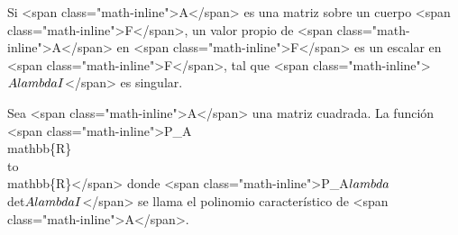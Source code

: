 \documentclass{report}
\begin{document}
    \begin{defBox}
        Si <span class="math-inline">A</span> es una matriz sobre un cuerpo <span class="math-inline">F</span>, un valor propio de <span class="math-inline">A</span> en <span class="math-inline">F</span> es un escalar en <span class="math-inline">F</span>, tal que <span class="math-inline">\(A \- \\lambda I\)</span> es singular.
    \end{defBox}

    \begin{defBox}
        Sea <span class="math-inline">A</span> una matriz cuadrada. La función <span class="math-inline">P\_A\: \\mathbb\{R\} \\to \\mathbb\{R\}</span> donde <span class="math-inline">P\_A\(\\lambda\) \= \\det\(A \- \\lambda I\)</span> se llama el polinomio característico de <span class="math-inline">A</span>.
    \end{defBox}

    
\end{document}

